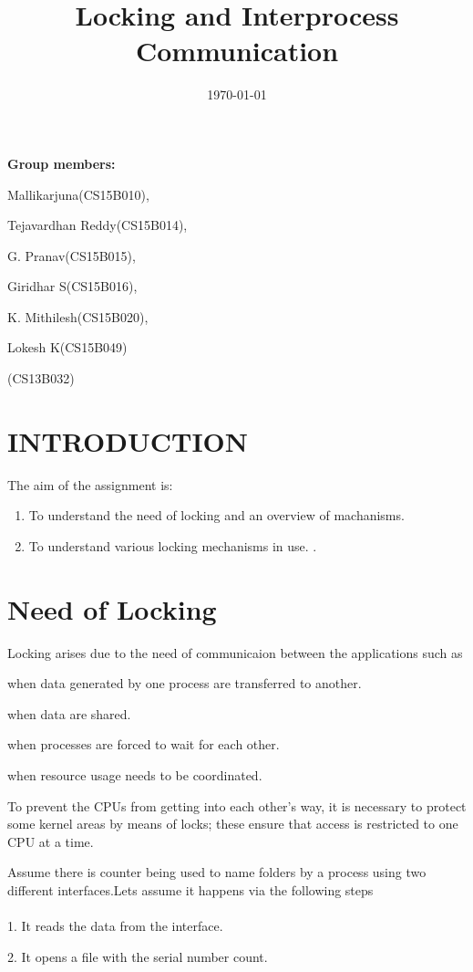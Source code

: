 \documentclass[a4paper]{article}
\title{Locking and Interprocess Communication}
\date{\today}
\begin{document}
\maketitle

\textbf{Group members:}

Mallikarjuna(CS15B010), 

Tejavardhan Reddy(CS15B014), 

G. Pranav(CS15B015), 

Giridhar S(CS15B016), 

K. Mithilesh(CS15B020), 

Lokesh K(CS15B049)

(CS13B032) 

\section{INTRODUCTION}
\label{sec:introduction}

The aim of the assignment is:
\begin{enumerate}
\item To understand the need of locking and an overview of machanisms.
\item To understand various locking mechanisms in use.
.
\end{enumerate}

\section{Need of Locking}
\label{sec:theory}
Locking arises due to the need of communicaion between the applications such as

when data generated by one process are transferred to another.

when data are shared.

when processes are forced to wait for each other.

when resource usage needs to be coordinated.

To prevent the CPUs from getting into each
other’s way, it is necessary to protect some kernel areas by means of locks; these ensure that access
is restricted to one CPU at a time.

Assume there is counter being used to name folders by a process using two different interfaces.Lets assume it happens via the following steps
\\~\\
1. It reads the data from the interface.

2. It opens a file with the serial number count.
\end{document}
